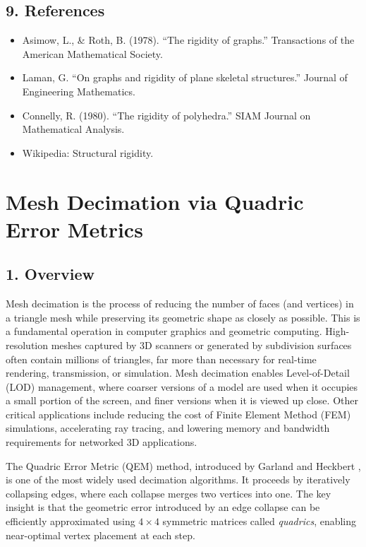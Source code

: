 \subsection{9. References}

\begin{itemize}
    \item Asimow, L., \& Roth, B. (1978). ``The rigidity of graphs.'' Transactions of the American Mathematical Society.
    \item Laman, G. \cite{laman1970} ``On graphs and rigidity of plane skeletal structures.'' Journal of Engineering Mathematics.
    \item Connelly, R. (1980). ``The rigidity of polyhedra.'' SIAM Journal on Mathematical Analysis.
    \item Wikipedia: Structural rigidity.
\end{itemize}

\section{Mesh Decimation via Quadric Error Metrics}
\label{sec:mesh_decimation_qem}

\subsection{1. Overview}

Mesh decimation is the process of reducing the number of faces (and vertices) in a triangle mesh while preserving its geometric shape as closely as possible. This is a fundamental operation in computer graphics and geometric computing. High-resolution meshes captured by 3D scanners or generated by subdivision surfaces often contain millions of triangles, far more than necessary for real-time rendering, transmission, or simulation. Mesh decimation enables Level-of-Detail (LOD) management, where coarser versions of a model are used when it occupies a small portion of the screen, and finer versions when it is viewed up close. Other critical applications include reducing the cost of Finite Element Method (FEM) simulations, accelerating ray tracing, and lowering memory and bandwidth requirements for networked 3D applications.

The Quadric Error Metric (QEM) method, introduced by Garland and Heckbert \cite{garland1997}, is one of the most widely used decimation algorithms. It proceeds by iteratively collapsing edges, where each collapse merges two vertices into one. The key insight is that the geometric error introduced by an edge collapse can be efficiently approximated using $4 \times 4$ symmetric matrices called \emph{quadrics}, enabling near-optimal vertex placement at each step.

